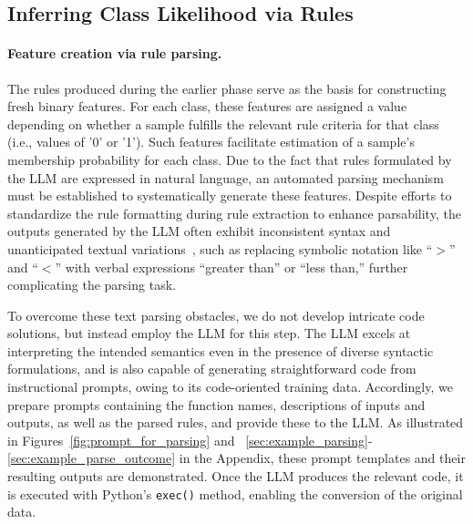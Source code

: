 \subsection{Inferring Class Likelihood via Rules}
\label{Sec:training}

\paragraph{Feature creation via rule parsing.} The rules produced during the earlier phase serve as the basis for constructing fresh binary features. For each class, these features are assigned a value depending on whether a sample fulfills the relevant rule criteria for that class (i.e., values of '0' or '1'). Such features facilitate estimation of a sample’s membership probability for each class. Due to the fact that rules formulated by the LLM are expressed in natural language, an automated parsing mechanism must be established to systematically generate these features. Despite efforts to standardize the rule formatting during rule extraction to enhance parsability, the outputs generated by the LLM often exhibit inconsistent syntax and unanticipated textual variations~\cite{kovavc2023large}, such as replacing symbolic notation like ``$>$'' and ``$<$'' with verbal expressions ``greater than'' or ``less than,'' further complicating the parsing task.

To overcome these text parsing obstacles, we do not develop intricate code solutions, but instead employ the LLM for this step. The LLM excels at interpreting the intended semantics even in the presence of diverse syntactic formulations, and is also capable of generating straightforward code from instructional prompts, owing to its code-oriented training data. Accordingly, we prepare prompts containing the function names, descriptions of inputs and outputs, as well as the parsed rules, and provide these to the LLM. As illustrated in Figures~\ref{fig:prompt_for_parsing} and ~\ref{sec:example_parsing}-\ref{sec:example_parse_outcome} in the Appendix, these prompt templates and their resulting outputs are demonstrated. Once the LLM produces the relevant code, it is executed with Python's \texttt{exec()} method, enabling the conversion of the original data.

\vspace*{-0.12in}
